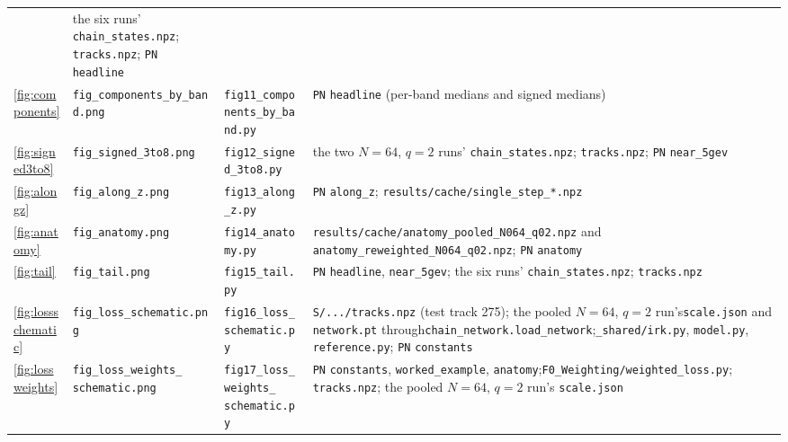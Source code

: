 \documentclass[11pt,a4paper]{article}
\begin{document}
\begin{table}[htbp]
\begin{tabular}{@{}l l l p{7.0cm}@{}}
      & the six runs' \texttt{chain\_states.npz}; \texttt{tracks.npz}; \texttt{PN} \texttt{headline} \\
    \ref{fig:components} & \texttt{fig\_components\_by\_band.png} & \texttt{fig11\_components\_by\_band.py}
      & \texttt{PN} \texttt{headline} (per-band medians and signed medians) \\
    \ref{fig:signed3to8} & \texttt{fig\_signed\_3to8.png} & \texttt{fig12\_signed\_3to8.py}
      & the two $N = 64$, $q = 2$ runs' \texttt{chain\_states.npz}; \texttt{tracks.npz}; \texttt{PN} \texttt{near\_5gev} \\
    \ref{fig:alongz} & \texttt{fig\_along\_z.png} & \texttt{fig13\_along\_z.py}
      & \texttt{PN} \texttt{along\_z}; \texttt{results/cache/single\_step\_*.npz} \\
    \ref{fig:anatomy} & \texttt{fig\_anatomy.png} & \texttt{fig14\_anatomy.py}
      & \texttt{results/cache/}\newline \texttt{anatomy\_pooled\_N064\_q02.npz} and \texttt{anatomy\_reweighted\_N064\_q02.npz}; \texttt{PN} \texttt{anatomy} \\
    \ref{fig:tail} & \texttt{fig\_tail.png} & \texttt{fig15\_tail.py}
      & \texttt{PN} \texttt{headline}, \texttt{near\_5gev}; the six runs' \texttt{chain\_states.npz}; \texttt{tracks.npz} \\
    \ref{fig:lossschematic} & \texttt{fig\_loss\_schematic.png} & \texttt{fig16\_loss\_schematic.py}
      & \texttt{S/.../tracks.npz} (test track 275); the pooled $N = 64$, $q = 2$ run's\newline \texttt{scale.json} and \texttt{network.pt} through\newline \texttt{chain\_network.load\_network};\newline \texttt{\_shared/irk.py}, \texttt{model.py}, \texttt{reference.py}; \texttt{PN} \texttt{constants} \\
    \ref{fig:lossweights} & \shortstack[l]{\texttt{fig\_loss\_weights\_}\\\texttt{schematic.png}} & \shortstack[l]{\texttt{fig17\_loss\_weights\_}\\\texttt{schematic.py}}
      & \texttt{PN} \texttt{constants}, \texttt{worked\_example}, \texttt{anatomy};\newline \texttt{F0\_Weighting/weighted\_loss.py}; \texttt{tracks.npz}; the pooled $N = 64$, $q = 2$ run's \texttt{scale.json} \\
    \bottomrule
  \end{tabular}
\end{table}
\end{document}
